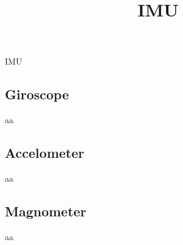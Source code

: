 \documentclass[a4paper]{article}
\title{IMU}
\date{}
\begin{document}
    \maketitle
    IMU
    
    \subsection{Giroscope}
        aa
    
    \subsection{Accelometer}
        aa
    
    \subsection{Magnometer}
        aa
\end{document}
